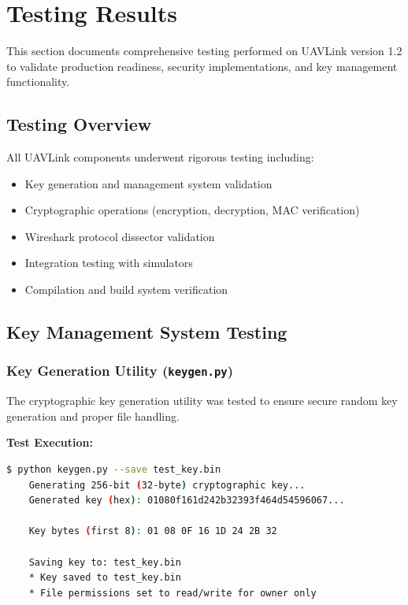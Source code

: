 \documentclass[11pt,a4paper]{article}
\begin{document}
\newpage
\section{Testing Results}

This section documents comprehensive testing performed on UAVLink version 1.2 to validate production readiness, security implementations, and key management functionality.

\subsection{Testing Overview}

All UAVLink components underwent rigorous testing including:
\begin{itemize}[noitemsep]
	\item Key generation and management system validation
	\item Cryptographic operations (encryption, decryption, MAC verification)
	\item Wireshark protocol dissector validation
	\item Integration testing with simulators
	\item Compilation and build system verification
\end{itemize}

\subsection{Key Management System Testing}

\subsubsection{Key Generation Utility (\texttt{keygen.py})}

The cryptographic key generation utility was tested to ensure secure random key generation and proper file handling.

\textbf{Test Execution:}
\begin{lstlisting}[language=bash,basicstyle=\ttfamily\footnotesize]
	$ python keygen.py --save test_key.bin
	Generating 256-bit (32-byte) cryptographic key...
	Generated key (hex): 01080f161d242b32393f464d54596067...
	
	Key bytes (first 8): 01 08 0F 16 1D 24 2B 32
	
	Saving key to: test_key.bin
	* Key saved to test_key.bin
	* File permissions set to read/write for owner only
\end{lstlisting}
\end{document}
